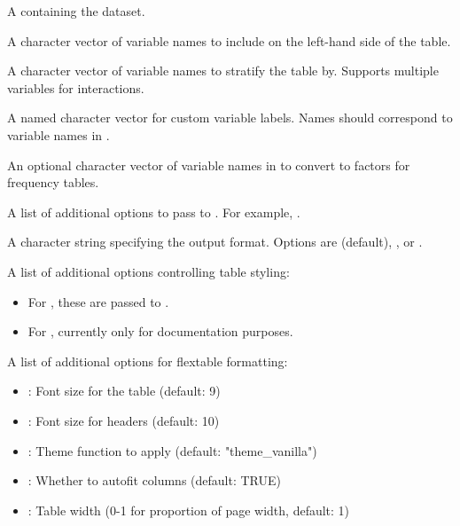 \documentclass[a4paper]{book}
\begin{document}
\begin{Arguments}
\begin{ldescription}
\item[\code{data}] A  containing the dataset.

\item[\code{vars}] A character vector of variable names to include on the left-hand side of the table.

\item[\code{by}] A character vector of variable names to stratify the table by. Supports multiple variables for interactions.

\item[\code{labels}] A named character vector for custom variable labels. Names should correspond to variable names in .

\item[\code{factor\_vars}] An optional character vector of variable names in  to convert to factors for frequency tables.

\item[\code{table1\_opts}] A list of additional options to pass to . For example, .

\item[\code{format}] A character string specifying the output format. Options are  (default), , or .

\item[\code{kable\_opts}] A list of additional options controlling table styling:
\begin{itemize}

\item{} For , these are passed to .
\item{} For , currently only for documentation purposes.

\end{itemize}


\item[\code{flex\_opts}] A list of additional options for flextable formatting:
\begin{itemize}

\item{} : Font size for the table (default: 9)
\item{} : Font size for headers (default: 10)
\item{} : Theme function to apply (default: "theme\_vanilla")
\item{} : Whether to autofit columns (default: TRUE)
\item{} : Table width (0-1 for proportion of page width, default: 1)


\end{itemize}
\end{ldescription}
\end{Arguments}
\end{document}
